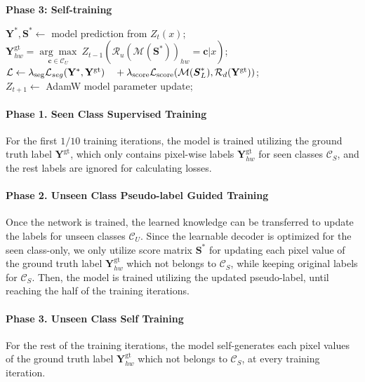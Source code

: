 \documentclass[nohyperref]{article}
\newcommand{\bs}{\boldsymbol}
\newcommand{\asty}{{\mathbf{Y}^*}}
\newcommand{\gty}{\mbf{Y}^{\text{gt}}}
\newcommand{\mc}{\mathcal}
\newcommand{\mbf}{\mathbf}
\theoremstyle{plain}
\theoremstyle{definition}
\theoremstyle{remark}
\begin{document}
\begin{algorithm}
{\bfseries Phase 3: Self-training}

{
$\asty, \bs{S^{\ast}} \leftarrow$ model prediction from $Z_{t}(x)$; \\
\If{$\gty_{hw} \not\in \mc{C}_S$}
{$\gty_{hw} = \underset{\bs{c} \in \mc{C}_U}{\arg{\max}} \ Z_{t-1}(\mathcal{R}_{u}(\mathcal{M}(\bs{S^{\ast}}))_{hw} = \bs{c}|x)$;}
$ \mathcal{L} \leftarrow \lambda_{\text{seg}}\mathcal{L}_{seg}(\asty, \gty) \\ 
    {} \quad +\lambda_{\text{score}} \mathcal{L}_{\text{score}}(\mathcal{M}(\bs{S}^{\ast}_L),\mathcal{R}_{d}(\gty))$; \\
$Z_{t+1}\leftarrow$ AdamW model parameter update;
}   
\end{algorithm}


\paragraph{Phase 1. Seen Class Supervised Training}
For the first $1/10$ training iterations, the model is trained utilizing the ground truth label $\gty$, which only contains pixel-wise labels $\gty_{hw}$ for seen classes $\mc{C}_S$, and the rest labels are ignored for calculating losses. 

\paragraph{Phase 2. Unseen Class Pseudo-label Guided Training}
Once the network is trained, the learned knowledge can be transferred to update the labels for unseen classes $\mc{C}_U$. Since the learnable decoder is optimized for the seen class-only, we only utilize score matrix $\bs{S^{\ast}}$ for updating each pixel value of the ground truth label $\gty_{hw}$ which not belongs to $\mc{C}_S$, while keeping original labels for $\mc{C}_S$.
Then, the model is trained utilizing the updated pseudo-label, until reaching the half of the training iterations.

\paragraph{Phase 3. Unseen Class Self Training}
For the rest of the training iterations, the model self-generates each pixel values of the ground truth label $\gty_{hw}$ which not belongs to $\mc{C}_S$, at every training iteration.%
\end{document}
